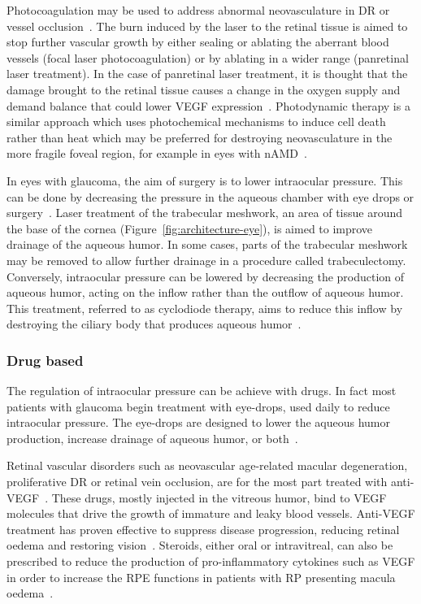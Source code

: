 \documentclass{article}
\begin{document}
Photocoagulation may be used to address abnormal neovasculature in DR or vessel occlusion~\cite{Evans_2014}.
The burn induced by the laser to the retinal tissue is aimed to stop further vascular growth by either sealing or ablating the aberrant blood vessels (focal laser photocoagulation) or by ablating in a wider range (panretinal laser treatment).
In the case of panretinal laser treatment, it is thought that the damage brought to the retinal tissue causes a change in the oxygen supply and demand balance that could lower VEGF expression~\cite{Evans_2014}.
Photodynamic therapy is a similar approach which uses photochemical mechanisms to induce cell death rather than heat which may be preferred for destroying neovasculature in the more fragile foveal region, for example in eyes with nAMD~\cite{SchmidtErfurth_2000}.

In eyes with glaucoma, the aim of surgery is to lower intraocular pressure.
This can be done by decreasing the pressure in the aqueous chamber with eye drops or surgery~\cite{Quigley_2011}.
Laser treatment of the trabecular meshwork, an area of tissue around the base of the cornea (Figure~\ref{fig:architecture-eye}), is aimed to improve drainage of the aqueous humor.
In some cases, parts of the trabecular meshwork may be removed to allow further drainage in a procedure called trabeculectomy.
Conversely, intraocular pressure can be lowered by decreasing the production of aqueous humor, acting on the inflow rather than the outflow of aqueous humor.
This treatment, referred to as cyclodiode therapy, aims to reduce this inflow by destroying the ciliary body that produces aqueous humor~\cite{Allbon_2022}.

\subsubsection{Drug based}

The regulation of intraocular pressure can be achieve with drugs.
In fact most patients with glaucoma begin treatment with eye-drops, used daily to reduce intraocular pressure.
The eye-drops are designed to lower the aqueous humor production, increase drainage of aqueous humor, or both~\cite{Chakrabarti_2022,Quigley_2011}.

Retinal vascular disorders such as neovascular age-related macular degeneration, proliferative DR or retinal vein occlusion, are for the most part treated with anti-VEGF~\cite{Andreoli_2007,Kim_2021}.
These drugs, mostly injected in the vitreous humor, bind to VEGF molecules that drive the growth of immature and leaky blood vessels.
Anti-VEGF treatment has proven effective to suppress disease progression, reducing retinal oedema and restoring vision~\cite{Andreoli_2007,Heier_2006,Kim_2021}.
Steroids, either oral or intravitreal, can also be prescribed to reduce the production of pro-inflammatory cytokines such as VEGF in order to increase the RPE functions in patients with RP presenting macula oedema~\cite{Strong_2016}.
\end{document}
